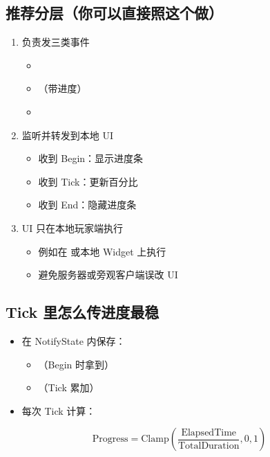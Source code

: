 \subsection{推荐分层（你可以直接照这个做）}
\begin{enumerate}
	\item{  负责发三类事件}
	
	\begin{itemize}
		\item {}
		\item {}（带进度）
		\item {}
	\end{itemize}
	
	\item{  监听并转发到本地 UI}
	
	\begin{itemize}
		\item 收到 Begin：显示进度条
		\item 收到 Tick：更新百分比
		\item 收到 End：隐藏进度条
	\end{itemize}
	
	\item{ UI 只在本地玩家端执行}
	
	\begin{itemize}
		\item 例如在  或本地 Widget 上执行
		\item 避免服务器或旁观客户端误改 UI
	\end{itemize}
\end{enumerate}

\subsection{Tick 里怎么传进度最稳}

\begin{itemize}
	\item 在 NotifyState 内保存：
	\begin{itemize}
		\item {}（Begin 时拿到）
		\item {}（Tick 累加）
	\end{itemize}
	\item 每次 Tick 计算：
\end{itemize}

\[
\text{Progress} = \mathrm{Clamp}\left(\frac{\text{ElapsedTime}}{\text{TotalDuration}}, 0, 1\right)
\]


